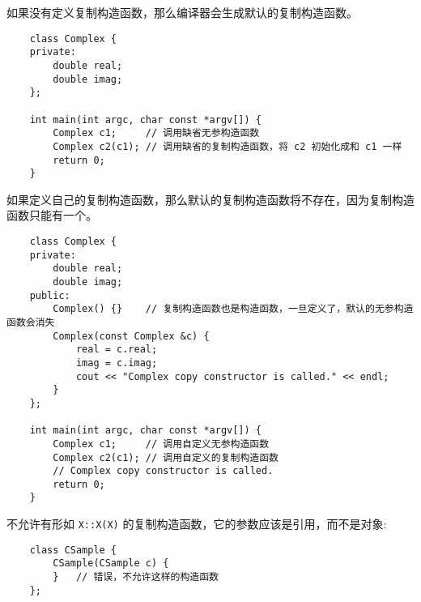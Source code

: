 \documentclass[UTF8]{ctexart}
\begin{document}
如果没有定义复制构造函数，那么编译器会生成默认的复制构造函数。
\begin{verbatim}
    class Complex {
    private:
        double real;
        double imag;
    };

    int main(int argc, char const *argv[]) {
        Complex c1;     // 调用缺省无参构造函数
        Complex c2(c1); // 调用缺省的复制构造函数，将 c2 初始化成和 c1 一样
        return 0;
    }
\end{verbatim}

如果定义自己的复制构造函数，那么默认的复制构造函数将不存在，因为复制构造函数只能有一个。
\begin{verbatim}
    class Complex {
    private:
        double real;
        double imag;
    public:
        Complex() {}    // 复制构造函数也是构造函数，一旦定义了，默认的无参构造函数会消失
        Complex(const Complex &c) {
            real = c.real;
            imag = c.imag;
            cout << "Complex copy constructor is called." << endl;
        }
    };

    int main(int argc, char const *argv[]) {
        Complex c1;     // 调用自定义无参构造函数
        Complex c2(c1); // 调用自定义的复制构造函数
        // Complex copy constructor is called.
        return 0;
    }
\end{verbatim}

不允许有形如 \texttt{X::X(X)} 的复制构造函数，它的参数应该是引用，而不是对象:
\begin{verbatim}
    class CSample {
        CSample(CSample c) {
        }   // 错误，不允许这样的构造函数
    };
\end{verbatim}
\end{document}
